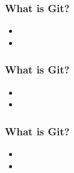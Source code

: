 \documentclass{beamer}
\begin{document}
\begin{frame}
\frametitle{What is Git?}
\begin{itemize}
\item  
\item
\end{itemize}
\end{frame}

\begin{frame}
\frametitle{What is Git?}
\begin{itemize}
\item  
\item
\end{itemize}
\end{frame}

\begin{frame}
\frametitle{What is Git?}
\begin{itemize}
\item  
\item
\end{itemize}
\end{frame}
\end{document}
